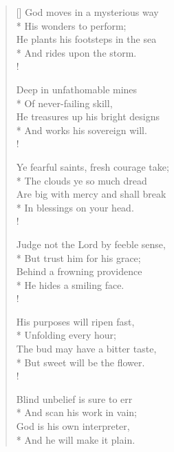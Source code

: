 \documentclass[MAIN]{subfiles}
\begin{document}
\settowidth{\versewidth}{God moves in a mysterious way}
\begin{verse}[\versewidth]
God moves in a mysterious way\\*
\vin His wonders to perform;\\
He plants his footsteps in the sea\\*
\vin And rides upon the storm.\\!

Deep in unfathomable mines\\*
\vin Of never-failing skill,\\
He treasures up his bright designs\\*
\vin And works his sovereign will.\\!

Ye fearful saints, fresh courage take;\\*
\vin The clouds ye so much dread\\
Are big with mercy and shall break\\*
\vin In blessings on your head.\\!

Judge not the Lord by feeble sense,\\*
\vin But trust him for his grace;\\
Behind a frowning providence\\*
\vin He hides a smiling face.\\!

His purposes will ripen fast,\\*
\vin Unfolding every hour;\\
The bud may have a bitter taste,\\*
\vin But sweet will be the flower.\\!

Blind unbelief is sure to err\\*
\vin And scan his work in vain;\\
God is his own interpreter,\\*
\vin And he will make it plain.
\end{verse}
\end{document}
